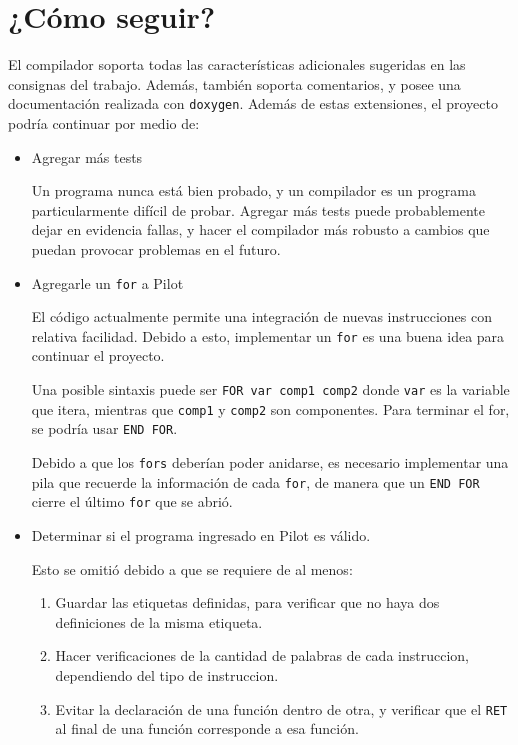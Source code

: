 \documentclass[12pt,spanish]{article}
\begin{document}
\section{¿Cómo seguir?}
El compilador soporta todas las características adicionales sugeridas en las consignas del trabajo. Además, también soporta comentarios, y posee una documentación realizada con \texttt{doxygen}.
Además de estas extensiones, el proyecto podría continuar por medio de:
\begin{itemize}
\item{Agregar más tests}

Un programa nunca está bien probado, y un compilador es un programa particularmente difícil de probar. Agregar más tests puede probablemente dejar en evidencia fallas, y hacer el compilador más robusto a cambios que puedan provocar problemas en el futuro.

\item{Agregarle un \texttt{for} a Pilot}

El código actualmente permite una integración de nuevas instrucciones con relativa facilidad. Debido a esto, implementar un \texttt{for} es una buena idea para continuar el proyecto. 

Una posible sintaxis puede ser \texttt{FOR var comp1 comp2} donde \texttt{var} es la variable que itera, mientras que \texttt{comp1} y \texttt{comp2} son componentes. Para terminar el for, se podría usar \texttt{END FOR}.

Debido a que los \texttt{fors} deberían poder anidarse, es necesario implementar una pila que recuerde la información de cada \texttt{for}, de manera que un \texttt{END FOR} cierre el último \texttt{for} que se abrió.

\item{Determinar si el programa ingresado en Pilot es válido.}

Esto se omitió debido a que se requiere de al menos:
\begin{enumerate}
\item{Guardar las etiquetas definidas, para verificar que no haya dos definiciones de la misma etiqueta.}
\item{Hacer verificaciones de la cantidad de palabras de cada instruccion, dependiendo del tipo de instruccion.}
\item{Evitar la declaración de una función dentro de otra, y verificar que el \texttt{RET} al final de una función corresponde a esa función.}
\end{enumerate}


\end{itemize}
\end{document}
